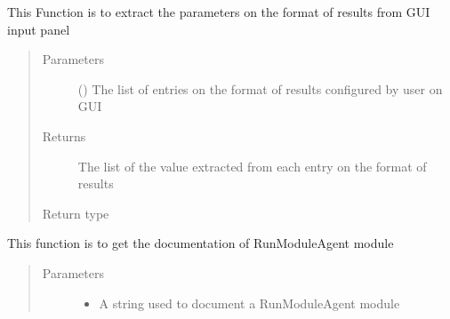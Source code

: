 \documentclass[letterpaper,10pt,english]{sphinxmanual}
\begin{document}
\begin{fulllineitems}
\begin{fulllineitems}
\label{\detokenize{AgentTools.GenericModelAgent:AgentTools.GenericModelAgent.RunModuleAgent.RunModuleAgent.extract_results_format}}
This Function is to extract the parameters on the format of results from GUI input panel
\begin{quote}\begin{description}
\item[{Parameters}] \leavevmode
{} () \textendash{} The list of entries on the format of results configured by user on GUI

\item[{Returns}] \leavevmode
The list of the value extracted from each entry on the format of results

\item[{Return type}] \leavevmode
{}

\end{description}\end{quote}

\end{fulllineitems}


\begin{fulllineitems}
\label{\detokenize{AgentTools.GenericModelAgent:AgentTools.GenericModelAgent.RunModuleAgent.RunModuleAgent.get_documentation}}
This function is to get the documentation of RunModuleAgent module
\begin{quote}\begin{description}
\item[{Parameters}] \leavevmode\begin{itemize}
\item {} 
 \textendash{} A string used to document a RunModuleAgent module


\end{itemize}
\end{description}
\end{quote}
\end{fulllineitems}
\end{fulllineitems}
\end{document}

